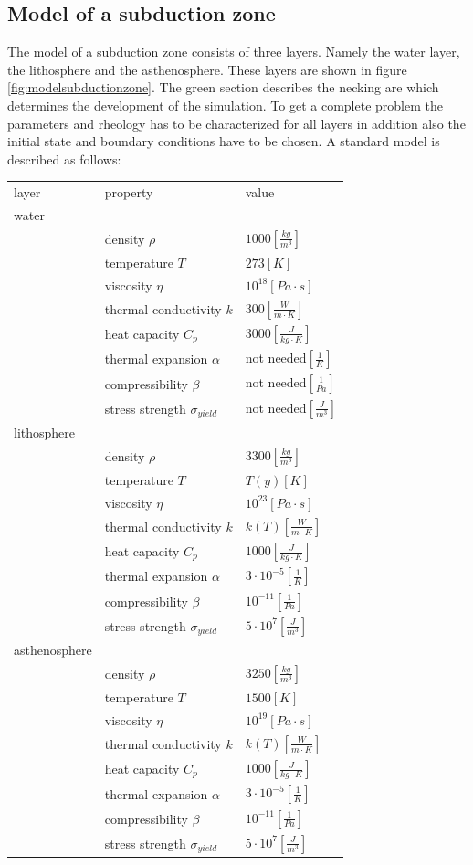 \documentclass[12pt]{scrreprt}
\begin{document}
\subsection{Model of a subduction zone}
The model of a subduction zone consists of three layers. Namely the water layer, the lithosphere and the asthenosphere. These layers are shown in figure \ref{fig:modelsubductionzone}. The green section describes the necking are which determines the development of the simulation. To get a complete problem the parameters and rheology has to be characterized for all layers in addition also the initial state and boundary conditions have to be chosen. A standard model is described as follows:

\begin{tabular}{lll}
layer&property&value\\
water&&\\
&density $\rho$&$1000 [\frac{kg}{m^3}]$\\
&temperature $T$&$273[K]$\\
&viscosity $\eta$&$10^{18} [Pa\cdot s]$\\
&thermal conductivity $k$&$300 [\frac{W}{m\cdot K}]$\\
&heat capacity $C_p$&$3000 [\frac{J}{kg\cdot K}]$\\
&thermal expansion $\alpha$&not needed$[\frac{1}{K}]$\\
&compressibility $\beta$&not needed$[\frac{1}{Pa}]$\\
&stress strength $\sigma_{yield}$&not needed$[\frac{J}{m^3}]$ \\
lithosphere&&\\
&density $\rho$&$3300 [\frac{kg}{m^3}]$\\
&temperature $T$&$T(y) [K]$\\
&viscosity $\eta$&$10^{23} [Pa\cdot s]$\\
&thermal conductivity $k$&$k(T) [\frac{W}{m\cdot K}]$\\
&heat capacity $C_p$&$1000 [\frac{J}{kg\cdot K}]$\\
&thermal expansion $\alpha$&$3\cdot10^{-5}[\frac{1}{K}]$\\
&compressibility $\beta$&$10^{-11}[\frac{1}{Pa}]$\\
&stress strength $\sigma_{yield}$&$5\cdot 10^7[\frac{J}{m^3}]$ \\
asthenosphere&&\\
&density $\rho$&$3250 [\frac{kg}{m^3}]$\\
&temperature $T$&$1500 [K]$\\
&viscosity $\eta$&$10^{19} [Pa\cdot s]$\\
&thermal conductivity $k$&$k(T) [\frac{W}{m\cdot K}]$\\
&heat capacity $C_p$&$1000 [\frac{J}{kg\cdot K}]$\\
&thermal expansion $\alpha$&$3\cdot10^{-5}[\frac{1}{K}]$\\
&compressibility $\beta$&$10^{-11}[\frac{1}{Pa}]$\\
&stress strength $\sigma_{yield}$&$5\cdot 10^7[\frac{J}{m^3}]$ \\
\end{tabular}
\end{document}
